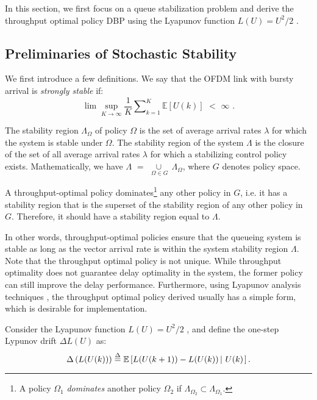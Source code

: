 \documentclass[11pt,journal, onecolumn]{./IEEEtran}
\newcommand{\red}{\color{black}}
\begin{document}
In this section, we first focus on a queue stabilization problem and derive the throughput optimal policy DBP using the {\red Lyapunov function $L(U) = U^{2}/{{2 }}$ \cite{andrews_scheduling_2004}}.

\subsection{Preliminaries of Stochastic Stability}
We first introduce a few definitions. We say that the OFDM link with bursty arrival is \emph{strongly stable} if: \[\lim \mathop {\sup }\limits_{K \to \infty } \frac{1}{K}\sum\nolimits_{k = 1}^K {\mathbb{E}[U(k)]} \,\, < \,\,\infty \,\,.\]

\begin{Definition} The stability region $\Lambda_{\Omega}$ of policy $\Omega$ is the set of average arrival rates $\lambda$ for which the system is stable under $\Omega$. The stability region of the system $\Lambda$ is the closure of the set of all average arrival rates $\lambda$ for which a stabilizing control policy exists. Mathematically, we have $\Lambda \,\, = \,\,\mathop { \cup \,}\limits_{\Omega  \in G} \,{\Lambda _\Omega }$, where $G$ denotes policy space. ~\hfill\IEEEQED
\end{Definition}

\begin{Definition} A throughput-optimal policy dominates\footnote{A policy $\Omega_1$ \emph{dominates} another policy $\Omega_2$ if $\Lambda_{\Omega_2} \subset \Lambda_{\Omega_1}$.} any other policy in $G$, i.e. it has a stability region that is the superset of the stability region of any other policy in $G$. Therefore, it should have a stability region equal to $\Lambda$. ~\hfill\IEEEQED
\end{Definition}

In  other  words,  throughput-optimal  policies  ensure  that  the  queueing  system  is  stable  as long as the vector arrival rate is within the system stability region $\Lambda$. Note that the throughput optimal policy is not unique. While throughput optimality does not guarantee delay optimality in the system, the former policy can still improve the delay performance. Furthermore, using Lyapunov analysis techniques \cite{georgiadis_resource_2006}, the throughput optimal policy derived usually has a simple form, which is desirable for implementation.



Consider the Lyapunov function $L(U) = {U^{2}{{}}}/{{2 }}$ \cite{andrews_scheduling_2004},
and define the one-step Lypunov drift $\Delta L(U)$ as:
\begin{equation}\label{Lyadef}
\Delta \left( {L(U(k) )} \right) \buildrel \Delta \over = \mathbb E \left[ {L(U(k + 1) ) - L(U(k) )\left| {\,\,U(k)} \right.} \right].
\end{equation}
\end{document}
